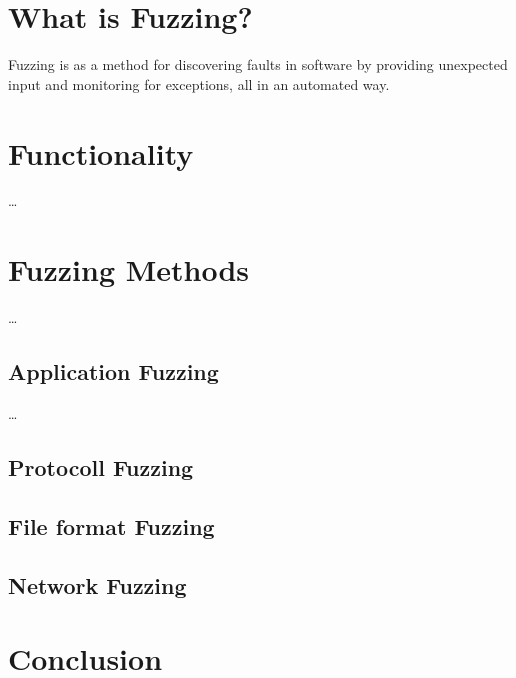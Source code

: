 \documentclass[journal=tosc,final]{iacrtrans}
\begin{document}
\section{What is Fuzzing?}
Fuzzing is as a method for discovering faults in software by providing unexpected input and monitoring for exceptions, all in an automated way.
\newpage
\section{Functionality}
\dots
\section{Fuzzing Methods}
\dots
\subsection{Application Fuzzing}
\dots
\subsection{Protocoll Fuzzing}
\subsection{File format Fuzzing}
\subsection{Network Fuzzing}
\section{Conclusion}





\end{document}
